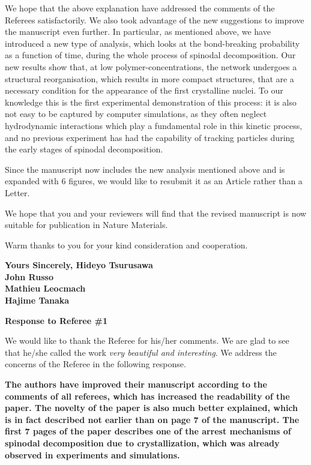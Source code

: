 \documentclass[11pt,a4paper]{article}
\newenvironment{referee}%
{\bigskip\singlespacing\bf}%
{\par\bigskip}
\begin{document}
We hope that the above explanation have addressed the comments of the Referees satisfactorily. We also took advantage of the new suggestions to improve the manuscript even further. In particular, as mentioned above, we have introduced a new type of analysis, which looks at the bond-breaking probability as a function of time, during the whole process of spinodal decomposition. Our new results show that, at low polymer-concentrations, the network undergoes a structural reorganisation, which results in more compact structures, that are a necessary condition for the appearance of the first crystalline nuclei. To our knowledge this is the first experimental demonstration of this process: it is also not easy to be captured by computer simulations, as they often neglect hydrodynamic interactions which play a fundamental role in this kinetic process, and no previous experiment has had the capability of tracking particles during the early stages of spinodal decomposition.

\vskip 0.3cm

Since the manuscript now includes the new analysis mentioned above and is expanded with 6 figures, we would like to resubmit it as an Article rather than a Letter. 
\textit{
\vskip 0.3cm}

We hope that you and your reviewers will find that the revised manuscript is now suitable for publication in Nature Materials. 

\vskip 0.5cm

Warm thanks to you for your kind consideration and cooperation. 

\vskip 0.8cm

\noindent
{\bf Yours Sincerely,
\vskip 0.3cm
\indent Hideyo Tsurusawa\\
\indent John Russo\\
\indent Mathieu Leocmach\\
\indent Hajime Tanaka}

\clearpage

\noindent
\begin{Large}
{\bf Response to Referee \#1}
\end{Large}

\vskip 0.5cm

We would like to thank the Referee for his/her comments. 
We are glad to see that he/she called the work \emph{very beautiful and interesting}. 
We address the concerns of the Referee in the following response.

\begin{referee}
The authors have improved their manuscript according to the comments of all referees, which has increased the readability of the paper. The novelty of the paper is also much better explained, which is in fact described not earlier than on page 7 of the manuscript.
The first 7 pages of the paper describes one of the arrest mechanisms of spinodal decomposition due to crystallization, which was already observed in experiments and simulations.
\end{referee}
\end{document}
